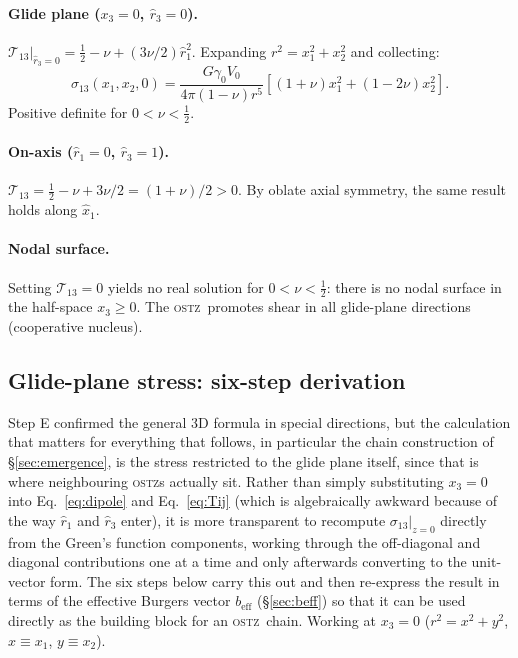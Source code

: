 \documentclass[5p,sort&compress]{elsarticle}
\newcommand{\OSTZ}{\textsc{ostz}}
\newcommand{\gz}{\gamma_0}
\newcommand{\beff}{b_\mathrm{eff}}
\newcommand{\half}{\tfrac{1}{2}}
\begin{document}
\paragraph{Glide plane ($x_3=0$, $\hat r_3=0$).}
$\mathcal T_{13}|_{\hat r_3=0}=\half-\nu+(3\nu/2)\hat r_1^2$.
Expanding $r^2=x_1^2+x_2^2$ and collecting:
\begin{equation}
  \sigma_{13}(x_1,x_2,0)=\frac{G\gz V_0}{4\pi(1-\nu)r^5}
  [(1+\nu)x_1^2+(1-2\nu)x_2^2].
  \label{eq:glidecheck}
\end{equation}
Positive definite for $0<\nu<\half$.

\paragraph{On-axis ($\hat r_1=0$, $\hat r_3=1$).}
$\mathcal T_{13}=\half-\nu+3\nu/2=(1+\nu)/2>0$. By oblate axial
symmetry, the same result holds along $\hat x_1$.

\paragraph{Nodal surface.}
Setting $\mathcal T_{13}=0$ yields no real solution for
$0<\nu<\half$: there is no nodal surface in the half-space
$x_3\ge0$. The \OSTZ\ promotes shear in all glide-plane directions
(cooperative nucleus).

\subsection{Glide-plane stress: six-step derivation}
\label{sec:glideplane}

Step E confirmed the general 3D formula in special directions, but
the calculation that matters for everything that follows, in
particular the chain construction of \S\ref{sec:emergence}, is the
stress restricted to the glide plane itself, since that is where
neighbouring \OSTZ s actually sit. Rather than simply substituting
$x_3=0$ into Eq.~\eqref{eq:dipole} and Eq.~\eqref{eq:Tij} (which is
algebraically awkward because of the way $\hat r_1$ and $\hat r_3$
enter), it is more transparent to recompute $\sigma_{13}|_{z=0}$
directly from the Green's function components, working through the
off-diagonal and diagonal contributions one at a time and only
afterwards converting to the unit-vector form. The six steps below
carry this out and then re-express the result in terms of the
effective Burgers vector $\beff$ (\S\ref{sec:beff}) so that it can be
used directly as the building block for an \OSTZ\ chain.
Working at $x_3=0$ ($r^2=x^2+y^2$, $x\equiv x_1$, $y\equiv x_2$).
\end{document}
